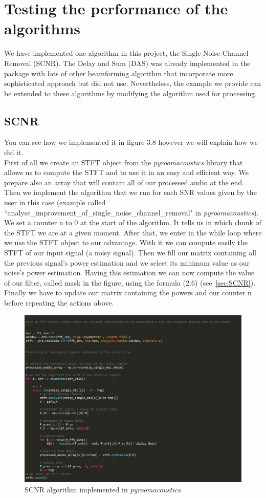 \documentclass[11pt,a4paper,titlepage]{report}
\begin{document}
\section{Testing the performance of the algorithms}
\hspace*{0.6cm}
We have implemented one algorithm in this project, the Single Noise Channel Removal (SCNR). The Delay and Sum (DAS) was already implemented in the package with lots of other beamforming algorithm that incorporate more sophisticated approach but did not use. Nevertheless, the example we provide can be extended to these algorithms by modifying the algorithm used for processing.\\

\subsection{SCNR}
You can see how we implemented it in figure 3.8 however we will explain how we did it.\\
First of all we create an STFT object from the \emph{pyroomacoustics} library that allows us to compute the STFT and to use it in an easy and efficient way. We prepare also an array that will contain all of our processed audio at the end.
Then we implement the algorithm that we run for each SNR values given by the user in this case (example called ``analyse\_improvement\_of\_single\_noise\_channel\_removal" in \textit{pyroomacoustics}). We set a counter n to 0 at the start of the algorithm. It tells us in which chunk of the STFT we are at a given moment. After that, we enter in the while loop where we use the STFT object to our advantage. With it we can compute easily the STFT of our input signal (a noisy signal). Then we fill our matrix containing all the previous signal's power estimation and we select its minimum value as our noise's power estimation. Having this estimation we can now compute the value of our filter, called mask in the figure, using the formula (2.6) (see~\ref{sec:SCNR}). Finally we have to update our matrix containing the powers and our counter n before repeating the actions above.\
\begin{figure}[h!]
	\centering
	\includegraphics[width=0.7\linewidth]{rapport11}
	\caption{SCNR algorithm implemented in \textit{pyroomacoustics}}
	\label{fig:rapport14}
\end{figure}\\
\end{document}
